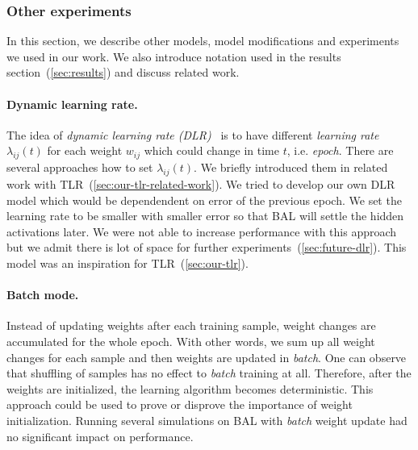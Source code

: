 \subsubsection{Other experiments}

In this section, we describe other models, model modifications and experiments we used in our work. We also introduce notation used in the results section~(\ref{sec:results}) and discuss related work. 

\paragraph{Dynamic learning rate.} 
\label{sec:our-dynamic-lambda} 
The idea of \emph{dynamic learning rate (DLR)}~\citep{jacobs1988increased} is to have different \emph{learning rate} $\lambda_{ij}(t)$ for each weight $w_{ij}$ which could change in time $t$, i.e. \emph{epoch}. There are several approaches how to set $\lambda_{ij}(t)$. We briefly introduced them in related work with TLR~(\ref{sec:our-tlr-related-work}). We tried to develop our own DLR model which would be dependendent on error of the previous epoch. We set the learning rate to be smaller with smaller error so that BAL will settle the hidden activations later. We were not able to increase performance with this approach but we admit there is lot of space for further experiments~(\ref{sec:future-dlr}). This model was an inspiration for TLR~(\ref{sec:our-tlr}). 

\paragraph{Batch mode.} Instead of updating weights after each training sample, weight changes are accumulated for the whole epoch. With other words, we sum up all weight changes for each sample and then weights are updated in \emph{batch}. One can observe that shuffling of samples has no effect to \emph{batch} training at all. Therefore, after the weights are initialized, the learning algorithm becomes deterministic. This approach could be used to prove or disprove the importance of weight initialization. Running several simulations on BAL with \emph{batch} weight update had no significant impact on performance. 


